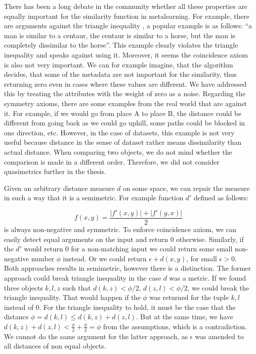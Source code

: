 There has been a long debate in the community whether all these properties are equally important
for the similarity function in metalearning. For example, there are arguments
against the triangle inequality \cite{Ashby88towarda}, a popular example is as
follows: ``a man is similar to a centaur, the centaur is similar to a horse, but the man is completely dissimilar to the horse''. This example clearly violates the triangle inequality and speaks against using it. Moreover, it seems the coincidence axiom is also not very important. We can for example imagine, that the algorithm decides, that some of the metadata are not important for the similarity, thus returning zero even in cases where these values are different. We have addressed this by treating the attributes with the weight of zero as a noise. 
Regarding the symmetry axioms, there are some examples from the real world that are against it. For example, if we would go from place A to place B, the distance could be different from going back as we could go uphill, some paths could be blocked in one direction, etc. However, in the case of datasets, this example is not very useful because distance in the sense of dataset rather means dissimilarity than actual distance. When comparing two objects, we do not mind whether the comparison is made in a different order. Therefore, we did not consider quasimetrics further in the thesis.

Given an arbitrary distance measure $d$ on some space, we can repair the measure in such a way that it is a semimetric. For example function $d'$ defined as follows:

\begin{equation}
\label{eq:semimetricRepairment}
f(x,y) = \frac{|f'(x,y)|+|f'(y,x)|}{2}
\end{equation}
is always non-negative and symmetric. To enforce coincidence axiom, we can easily detect equal arguments on the input and return 0 otherwise. Similarly, if the $d'$ would return 0 for a non-matching input we could return some small non-negative number $\phi$ instead. Or we could return $\epsilon + d(x,y)$, for small $\epsilon > 0$. Both approaches results in semimetric, however there is a distinction. The former approach could break triangle inequality in the case $d$ was a metric. If we found three objects $k,l, z$ such that $d(k,z) < \phi/2$, $d(z, l) < \phi/2$, we could break the triangle inequality. That would happen if the $\phi$ was returned for the tuple $k,l$ instead of 0. For the triangle inequality to hold, it must be the case that the distance $\phi = d(k,l) \le d(k,z) + d(z,l)$. But at the same time, we have $d(k,z) + d(z,l)< \frac{\phi}{2} + \frac{\phi}{2}  = \phi$ from the assumptions, which is a contradiction.
We cannot do the same argument for the latter approach, as $\epsilon$ was amended to all distances of non equal objects.

